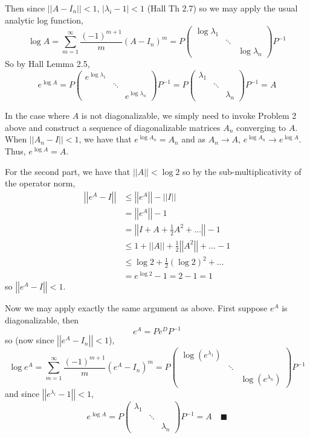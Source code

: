 \documentclass[12pt]{article}
\newcommand{\qed}{\quad \blacksquare}
\newcommand{\abs}[1]{\left\vert #1 \right\vert}
\newcommand{\norm}[1]{\left\vert \left\vert #1 \right\vert \right\vert}
\begin{document}
        Then since $\norm{A - I_n} < 1$, $\abs{\lambda_i - 1} < 1$ (Hall Th 2.7) so we may apply the usual analytic log function, 
        \[\log A= \sum_{m=1}^{\infty} \frac{(-1)^{m+1}}{m} (A - I_n)^m = P \begin{pmatrix}
            \log \lambda_1\\ 
            & \ddots\\
            & & \log \lambda_n
        \end{pmatrix}P^{-1}\]
        So by Hall Lemma 2.5, 
        \[e^{\log A} = P\begin{pmatrix}
            e^{\log \lambda_1}\\
            & \ddots\\
            & & e^{\log \lambda_n} 
        \end{pmatrix}P^{-1} = P\begin{pmatrix}
            \lambda_1\\
            & \ddots\\
            & & \lambda_n
        \end{pmatrix}P^{-1} = A \]

        In the case where $A$ is not diagonalizable, we simply need to invoke Problem 2 above and construct a sequence of diagonalizable matrices $A_n$ converging to $A$. When $\norm{A_n - I} < 1$, we have that $e^{\log A_n} = A_n$ and as $A_n \to A$, $e^{\log A_n} \to e^{\log A}$. Thus, $e^{\log A} = A$.

        For the second part, we have that $\norm{A} < \log 2$ so by the sub-multiplicativity of the operator norm,
        \begin{align*}
            \norm{e^A - I} &\leq \norm{e^A} - \norm{I}\\ 
                &= \norm{e^A} - 1\\ 
                &= \norm{I + A + \frac{1}{2}A^2 + \dots} - 1\\ 
                &\leq 1 + \norm{A} + \frac{1}{2}\norm{A^2} + \dots - 1\\ 
                &\leq \log 2 + \frac{1}{2}(\log 2)^2 + \dots \\ 
                &= e^{\log 2} - 1 = 2 - 1 = 1
        \end{align*}
        so $\norm{e^A - I} < 1$. 

        Now we may apply exactly the same argument as above. First suppose $e^A$ is diagonalizable, then 
        \[e^A = Pe^DP^{-1}\]
        so (now since $\norm{e^A - I_n}< 1$), 
        \[\log e^A = \sum_{m=1}^{\infty} \frac{(-1)^{m+1}}{m} (e^A - I_n)^m = P\begin{pmatrix}
            \log(e^{\lambda_1})\\
            & \ddots\\
            & & \log(e^{\lambda_n})
        \end{pmatrix}P^{-1}\]
        and since $\norm{e^{\lambda_i} - 1} < 1$, 
        \[e^{\log A} = P\begin{pmatrix}
            \lambda_1\\ 
            & \ddots\\
            & & \lambda_n
        \end{pmatrix}P^{-1} = A \qed\]
    \color{black}
\pagebreak
\end{document}
